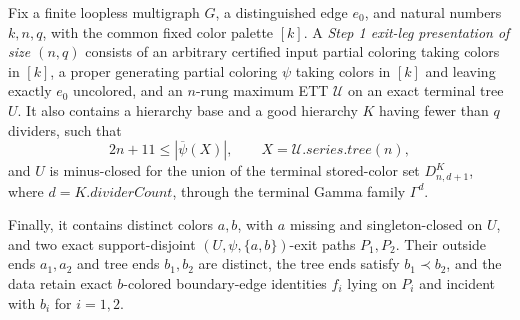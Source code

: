 \begin{definition}
Fix a finite loopless multigraph $G$, a distinguished edge $e_0$, and
natural numbers $k,n,q$, with the common fixed color palette $[k]$.  A
\emph{Step 1 exit-leg presentation of size $(n,q)$} consists of an
arbitrary certified input partial coloring taking colors in $[k]$, a proper
generating partial coloring $\psi$ taking colors in $[k]$ and leaving exactly
$e_0$ uncolored, and an $n$-rung maximum
ETT $\mathcal U$ on an exact terminal tree $U$.  It also contains a
hierarchy base and a good hierarchy $K$ having fewer than $q$ dividers,
such that
\[
 2n+11\leq |\overline\psi(X)|,
 \qquad X=\mathcal U.\mathit{series.tree}(n),
\]
and $U$ is minus-closed for the union of the terminal stored-color set
$D^K_{n,d+1}$, where $d=K.\mathit{dividerCount}$, through the terminal
Gamma family $\Gamma^d$.

Finally, it contains distinct colors $a,b$, with $a$ missing and
singleton-closed on $U$, and two exact support-disjoint
$(U,\psi,\{a,b\})$-exit paths $P_1,P_2$.  Their outside ends $a_1,a_2$
and tree ends $b_1,b_2$ are distinct, the tree ends satisfy
$b_1\prec b_2$, and the data retain exact $b$-colored boundary-edge
identities $f_i$ lying on $P_i$ and incident with $b_i$ for $i=1,2$.
\end{definition}
